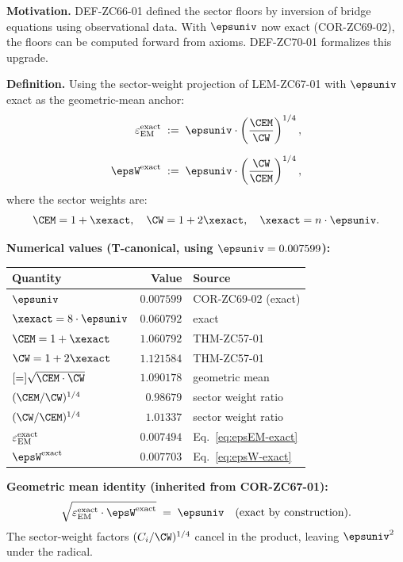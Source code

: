 \documentclass[12pt, a4paper]{article}
\renewcommand{\epsEM}{\varepsilon_{\rm EM}}
\begin{document}

\begin{formalbox}[title={DEF-ZC70-01: Exact Sector Floors
  Using $\varepsilon_{\rm univ}$ ($R_0/R_{\max}$, Exact)}]

\textbf{Motivation.}
DEF-ZC66-01 defined the sector floors by inversion of
bridge equations using observational data.
With $\epsuniv$ now exact (COR-ZC69-02), the floors
can be computed forward from axioms.
DEF-ZC70-01 formalizes this upgrade.

\textbf{Definition.}
Using the sector-weight projection of LEM-ZC67-01
with $\epsuniv$ exact as the geometric-mean anchor:
\begin{align}
  \epsEM^{\rm exact}
  &\;:=\;
  \epsuniv \cdot \left(\frac{\CEM}{\CW}\right)^{1/4},
  \label{eq:epsEM-exact}\\[6pt]
  \epsW^{\rm exact}
  &\;:=\;
  \epsuniv \cdot \left(\frac{\CW}{\CEM}\right)^{1/4},
  \label{eq:epsW-exact}
\end{align}
where the sector weights are:
\[
  \CEM = 1 + \xexact,
  \quad
  \CW  = 1 + 2\xexact,
  \quad
  \xexact = n\cdot\epsuniv.
\]

\textbf{Numerical values (T-canonical, using $\epsuniv = 0.007599$):}
\begin{center}
\renewcommand{\arraystretch}{1.25}
\begin{tabular}{@{}lrl@{}}
\toprule
Quantity & Value & Source \\
\midrule
$\epsuniv$ & $0.007599$ & COR-ZC69-02 (exact) \\
$\xexact = 8\cdot\epsuniv$ & $0.060792$ & exact \\
$\CEM = 1 + \xexact$ & $1.060792$ & THM-ZC57-01 \\
$\CW = 1 + 2\xexact$ & $1.121584$ & THM-ZC57-01 \\
$\Cref = \sqrt{\CEM\cdot\CW}$ & $1.090178$ & geometric mean \\
\midrule
$(\CEM/\CW)^{1/4}$ & $0.98679$ & sector weight ratio \\
$(\CW/\CEM)^{1/4}$ & $1.01337$ & sector weight ratio \\
\midrule
$\epsEM^{\rm exact}$ & $0.007494$ & Eq.~\eqref{eq:epsEM-exact} \\
$\epsW^{\rm exact}$  & $0.007703$ & Eq.~\eqref{eq:epsW-exact} \\
\bottomrule
\end{tabular}
\end{center}

\textbf{Geometric mean identity (inherited from COR-ZC67-01):}
\[
  \sqrt{\epsEM^{\rm exact} \cdot \epsW^{\rm exact}}
  \;=\; \epsuniv
  \quad\text{(exact by construction)}.
\]
The sector-weight factors $(C_i/\CW)^{1/4}$ cancel
in the product, leaving $\epsuniv^2$ under the radical.


\end{formalbox}
\end{document}
